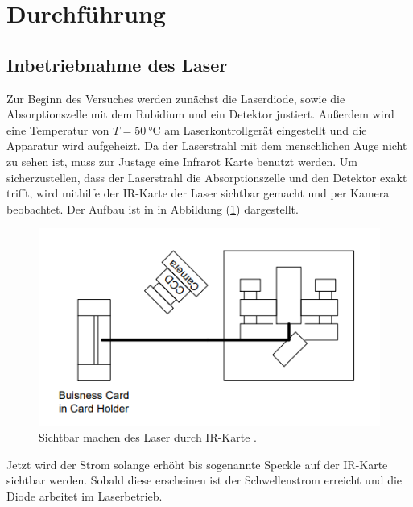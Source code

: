 \section{Durchführung}
\label{sec:Durchführung}
\subsection{Inbetriebnahme des Laser}
Zur Beginn des Versuches werden zunächst die Laserdiode, sowie die Absorptionszelle mit dem Rubidium und ein Detektor justiert. Außerdem wird eine Temperatur von $T=\SI{50}{\degreeCelsius}$ am Laserkontrollgerät eingestellt und die Apparatur wird aufgeheizt. Da der Laserstrahl mit dem menschlichen Auge nicht zu sehen ist,
muss zur Justage eine Infrarot Karte benutzt werden.
Um sicherzustellen, dass der Laserstrahl die Absorptionszelle und den Detektor exakt trifft, wird mithilfe der IR-Karte der Laser sichtbar gemacht und per Kamera beobachtet. Der Aufbau ist in in Abbildung (\ref{fig:auf1}) dargestellt.
\begin{figure}[h!]
  \centering
  \includegraphics[scale=0.7]{fig/auf1.png}
  \caption{Sichtbar machen des Laser durch IR-Karte \cite[6]{Anleitung4}.}
  \label{fig:auf1}
\end{figure}
\FloatBarrier
\noindent Jetzt wird der Strom solange erhöht bis sogenannte Speckle auf der IR-Karte sichtbar werden. Sobald diese erscheinen ist der Schwellenstrom erreicht und die Diode arbeitet im Laserbetrieb.
